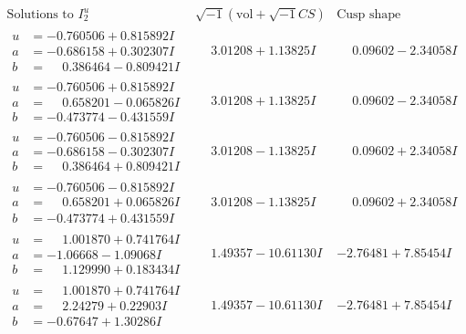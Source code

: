 \documentclass[1p]{elsarticle_modified}
\theoremstyle{definition}
\newcommand{\I}{\sqrt{-1}}
\begin{document}
$$\begin{array}{c|c|c}  
\text{Solutions to }I^u_{2}& \I (\text{vol} + \sqrt{-1}CS) & \text{Cusp shape}\\
 \hline 
\begin{aligned}
u &= -0.760506 + 0.815892 I \\
a &= -0.686158 + 0.302307 I \\
b &= \phantom{-}0.386464 - 0.809421 I\end{aligned}
 & \phantom{-}3.01208 + 1.13825 I & \phantom{-}0.09602 - 2.34058 I \\ \hline\begin{aligned}
u &= -0.760506 + 0.815892 I \\
a &= \phantom{-}0.658201 - 0.065826 I \\
b &= -0.473774 - 0.431559 I\end{aligned}
 & \phantom{-}3.01208 + 1.13825 I & \phantom{-}0.09602 - 2.34058 I \\ \hline\begin{aligned}
u &= -0.760506 - 0.815892 I \\
a &= -0.686158 - 0.302307 I \\
b &= \phantom{-}0.386464 + 0.809421 I\end{aligned}
 & \phantom{-}3.01208 - 1.13825 I & \phantom{-}0.09602 + 2.34058 I \\ \hline\begin{aligned}
u &= -0.760506 - 0.815892 I \\
a &= \phantom{-}0.658201 + 0.065826 I \\
b &= -0.473774 + 0.431559 I\end{aligned}
 & \phantom{-}3.01208 - 1.13825 I & \phantom{-}0.09602 + 2.34058 I \\ \hline\begin{aligned}
u &= \phantom{-}1.001870 + 0.741764 I \\
a &= -1.06668 - 1.09068 I \\
b &= \phantom{-}1.129990 + 0.183434 I\end{aligned}
 & \phantom{-}1.49357 - 10.61130 I & -2.76481 + 7.85454 I \\ \hline\begin{aligned}
u &= \phantom{-}1.001870 + 0.741764 I \\
a &= \phantom{-}2.24279 + 0.22903 I \\
b &= -0.67647 + 1.30286 I\end{aligned}
 & \phantom{-}1.49357 - 10.61130 I & -2.76481 + 7.85454 I \\ \hline\begin{aligned}

\end{aligned}
\end{array}$$
\end{document}
